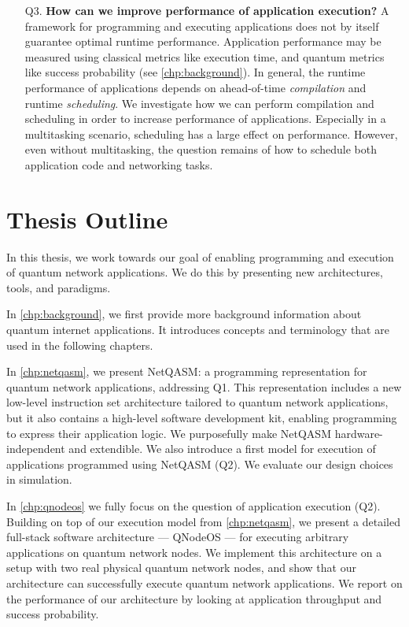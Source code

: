 \begin{itemize}
  \item[Q3.] \textbf{How can we improve performance of application execution?}
    A framework for programming and executing applications does not by itself guarantee optimal runtime performance.
    Application performance may be measured using classical metrics like execution time, and quantum metrics like success probability (see \cref{chp:background}).
    In general, the runtime performance of applications depends on ahead-of-time \emph{compilation} and runtime \emph{scheduling}.
    We investigate how we can perform compilation and scheduling in order to increase performance of applications.
    Especially in a multitasking scenario, scheduling has a large effect on performance.
    However, even without multitasking, the question remains of how to schedule both application code and networking tasks.

\end{itemize}


\section{Thesis Outline}
In this thesis, we work towards our goal of enabling programming and execution of quantum network applications.
We do this by presenting new architectures, tools, and paradigms.

In \cref{chp:background}, we first provide more background information about quantum internet applications.
It introduces concepts and terminology that are used in the following chapters.

In \cref{chp:netqasm}, we present NetQASM: a programming representation for quantum network applications, addressing Q1.
This representation includes a new low-level instruction set architecture tailored to quantum network applications,
but it also contains a high-level software development kit, enabling programming to express their application logic.
We purposefully make NetQASM hardware-independent and extendible.
We also introduce a first model for execution of applications programmed using NetQASM (Q2).
We evaluate our design choices in simulation.

In \cref{chp:qnodeos} we fully focus on the question of application execution (Q2).
Building on top of our execution model from \cref{chp:netqasm}, we present a detailed full-stack software architecture --- QNodeOS --- for executing arbitrary applications on quantum network nodes.
We implement this architecture on a setup with two real physical quantum network nodes, and show that our architecture can successfully execute quantum network applications.
We report on the performance of our architecture by looking at application throughput and success probability.


